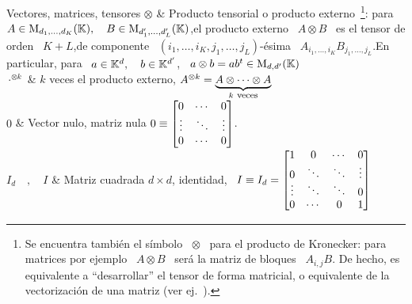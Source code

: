 \begin{notation}{Vectores, matrices, tensores}
%
$\otimes$  &  Producto   tensorial  o  producto  externo~\footnote{Se  encuentra
  tambi\'en  el s\'imbolo  \ $\otimes$  \ para  el producto  de  Kronecker: para
  matrices por ejemplo \ $A \otimes B$  \ ser\'a la matriz de bloques \
  $A_{i,j}  B$. De hecho,  es equivalente  a ``desarrollar''  el tensor  de forma
  matricial,   o  equivalente  de   la  vectorizaci\'on   de  una   matriz  (ver
  ej.~\cite{MagNeu79}).}:  para $A \in  \mathrm{M}_{d_1,\ldots,d_K}(\mathbb{K}), \quad  B \in
\mathrm{M}_{d'_1,\ldots,d'_L}(\mathbb{K})$,\newline  el producto  externo \ $A  \otimes B$ \  es el
tensor      de      orden      \      $K+L$,\newline         de      componente      \
$(i_1,\ldots,i_K,j_1,\ldots,j_L)$-\'esima          \         $A_{i_1,\ldots,i_K}
B_{j_1,\ldots,j_L} $.\vspace{1mm}\newline En particular, para \ $a \in \mathbb{K}^d, \quad
b \in \mathbb{K}^{d'}$, \ $a \otimes b = a b^t \in \mathrm{M}_{d,d'}(\mathbb{K})$\\[2.5mm]
\hline
%
$\cdot^{\otimes k}$ & $k$ veces el producto externo, $A^{\otimes k}
= \underbrace{A \otimes \cdots \otimes A}_{k \:\, \mbox{\footnotesize
veces}}$\\[2.5mm]
\hline
%
$0$ &  Vector nulo, matriz nula
$0 \equiv \protect\begin{bmatrix}
   0   & \cdots &    0   \\
\vdots & \ddots & \vdots \\
   0   & \cdots &    0
\protect\end{bmatrix}$.\vspace{1mm}\\[2.5mm]
\hline
%
$I_d \quad , \quad I$ & Matriz cuadrada $d \times d$, identidad, \ $I \equiv I_d
= \protect\begin{bmatrix}
   1   &    0   & \cdots &   0    \\[-.25mm]
   0   & \ddots & \ddots & \vdots \\[-1mm]
\vdots & \ddots & \ddots &   0    \\[-.25mm]
   0   & \cdots &    0   &   1
   \protect\end{bmatrix}$\newline

\end{notation}
